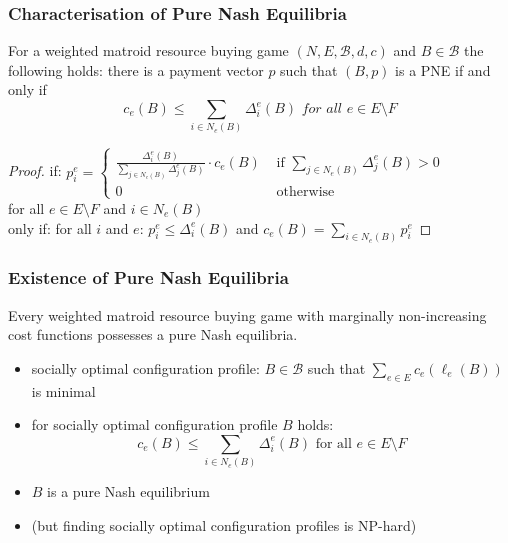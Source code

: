 \documentclass{beamer}
\newcommand{\tupel}[1]{\left(#1\right)}
\begin{document}
\begin{frame}
  \frametitle{Characterisation of Pure Nash Equilibria}
  \begin{theorem}
    For a weighted matroid resource buying game
    $\tupel{N, E, \mathcal{B}, d, c}$ and $B\in\mathcal{B}$ the following
    holds: there is a payment vector $p$ such that $\tupel{B,p}$ is a
    PNE if and only if
    \begin{equation*}
      c_{e}(B) \leq \sum_{i\in N_{e}(B)}\Delta_{i}^{e}(B)
      \textit{ for all }e\in E\setminus F
    \end{equation*}
  \end{theorem}
  \begin{proof}
    if: $p_{i}^{e} =
      \begin{cases}
        \frac{\Delta_{i}^{e}(B)}{\sum_{j\in N_{e}(B)}\Delta_{j}^{e}(B)}\cdot
        c_{e}(B)&\text{ if } \sum_{j\in N_{e}(B)}\Delta_{j}^{e}(B) > 0\\
        0 &\text{ otherwise}
      \end{cases}$\\
      for all $e\in E\setminus F$ and $i\in N_{e}(B)$\\
    only if: for all $i$ and $e$: $p_{i}^{e} \leq \Delta_{i}^{e}(B)$
      and $c_{e}(B) = \sum_{i\in N_{e}(B)}p_{i}^{e}$
  \end{proof}
\end{frame}

\begin{frame}
  \frametitle{Existence of Pure Nash Equilibria}
  \begin{theorem}
    Every weighted matroid resource buying game with marginally non-increasing
    cost functions possesses a pure Nash equilibria.
  \end{theorem}
  \begin{itemize}
    \item socially optimal configuration profile: $B\in\mathcal{B}$ such that
      $\sum_{e\in E}c_{e}(\ell_{e}(B))$ is minimal
    \item for socially optimal configuration profile $B$ holds:
      \begin{equation*}
        c_{e}(B)\leq \sum_{i\in N_{e}(B)}\Delta_{i}^{e}(B)
        \text{ for all }e\in E\setminus F
      \end{equation*}
    \item $B$ is a pure Nash equilibrium
    \item (but finding socially optimal configuration profiles is NP-hard)
  \end{itemize}
\end{frame}
\end{document}
